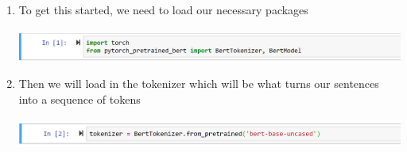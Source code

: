 \documentclass{article}
\begin{document}
\begin{enumerate}
    \item To get this started, we need to load our necessary packages\\
    \vspace{.1cm}\\
        \includegraphics[scale = .8]{import2.png}
        \vspace{.2cm}\\
    \item Then we will load in the tokenizer which will be what turns our sentences into a sequence of tokens\\
    \vspace{.1cm}\\
    \includegraphics[scale = .8]{token_picuture2.png}
    \vspace{.2cm}\\
    

\end{enumerate}
\end{document}
